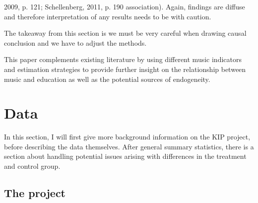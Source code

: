\documentclass[a4, 12pt]{article}
\begin{document}
2009, p. 121; Schellenberg, 2011, p. 190 association). Again, findings are diffuse and therefore interpretation of any results needs to be with caution.

The takeaway from this section is we must be very careful when drawing causal conclusion and we have to adjust the methods.

This paper complements existing literature by using different music indicators and estimation strategies to provide further insight on the relationship between music and education as well as the potential sources of endogeneity.

\clearpage

\hypertarget{data}{%
\section{Data}\label{data}}

\label{ch:data}
In this section, I will first give more background information on the KIP project, before describing the data themselves. After general summary statistics, there is a section about handling potential issues arising with differences in the treatment and control group.

\hypertarget{the-project}{%
\subsection{The project}\label{the-project}}
\end{document}
